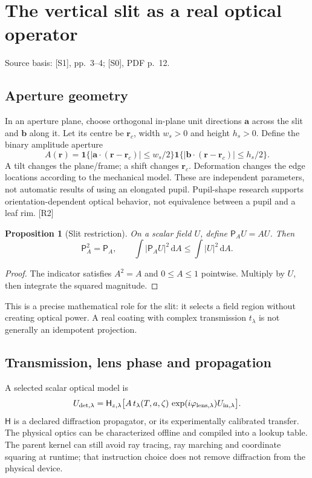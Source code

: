 \documentclass[10pt,a4paper]{article}
\numberwithin{equation}{section}
\newtheorem{proposition}{Proposition}[section]
\newcommand{\src}[1]{\textcolor{muted}{\footnotesize Source basis: #1.}}
\newcommand{\newpart}{\clearpage}
\newcommand{\ind}{\mathbf{1}}
\newcommand{\dd}{\,\mathrm{d}}
\begin{document}
\newpart
\section{The vertical slit as a real optical operator}
\label{sec:slit}
\src{[S1], pp.~3--4; [S0], PDF p.~12}

\subsection*{Aperture geometry}
In an aperture plane, choose orthogonal in-plane unit directions $\bm a$ across the slit and $\bm b$ along it. Let its centre be $\bm r_c$, width $w_s>0$ and height $h_s>0$. Define the binary amplitude aperture
\begin{equation}
A(\bm r)=\ind\{|\bm a\!\cdot(\bm r-\bm r_c)|\le w_s/2\}
\ind\{|\bm b\!\cdot(\bm r-\bm r_c)|\le h_s/2\}.
\end{equation}
A tilt changes the plane/frame; a shift changes $\bm r_c$. Deformation changes the edge locations according to the mechanical model. These are independent parameters, not automatic results of using an elongated pupil. Pupil-shape research supports orientation-dependent optical behavior, not equivalence between a pupil and a leaf rim. [R2]

\begin{proposition}[Slit restriction]
On a scalar field $U$, define $\mathsf P_AU=AU$. Then
\begin{equation}
\mathsf P_A^2=\mathsf P_A,\qquad
\int|\mathsf P_AU|^2\dd A\le\int|U|^2\dd A.
\end{equation}
\end{proposition}
\begin{proof}
The indicator satisfies $A^2=A$ and $0\le A\le1$ pointwise. Multiply by $U$, then integrate the squared magnitude.
\end{proof}
This is a precise mathematical role for the slit: it selects a field region without creating optical power. A real coating with complex transmission $t_\lambda$ is not generally an idempotent projection.

\subsection*{Transmission, lens phase and propagation}
A selected scalar optical model is
\begin{equation}
U_{{\rm det},\lambda}
=\mathsf H_{z,\lambda}
\big[A\,t_\lambda(T,a,\zeta)\,
\exp(i\varphi_{\rm lens,\lambda})U_{{\rm in},\lambda}\big].
\end{equation}
$\mathsf H$ is a declared diffraction propagator, or its experimentally calibrated transfer. The physical optics can be characterized offline and compiled into a lookup table. The parent kernel can still avoid ray tracing, ray marching and coordinate squaring at runtime; that instruction choice does not remove diffraction from the physical device.
\end{document}
